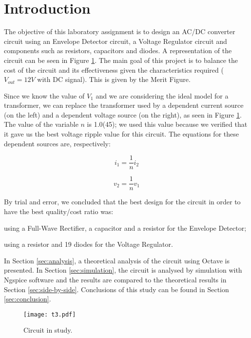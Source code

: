 \section{Introduction}
\label{sec:introduction}

The objective of this laboratory assignment is to design an AC/DC converter circuit using an Envelope Detector circuit, a Voltage Regulator circuit and components such as resistors, capacitors and diodes. A representation of the circuit can be seen in Figure \ref{fig:t3}. 
The main goal of this project is to balance the cost of the circuit and its effectiveness given the characteristics required ($V_{out}=12V$ with DC signal). This is given by the Merit Figure. \par
Since we know the value of $V_1$ and we are considering the ideal model for a transformer, we can replace the transformer used by a dependent current source (on the left) and a dependent voltage source (on the right), as seen in Figure \ref{fig:t3}. The value of the variable $n$ is 1.0(45); we used this value because we verified that it gave us the best voltage ripple value for this circuit. The equations for these dependent sources are, respectively:

\begin{equation}
  i_1=\frac{1}{n}i_2
  \label{eq:kvl1}
\end{equation} 

\begin{equation}
  v_2=\frac{1}{n}v_1
  \label{eq:kvl2}
\end{equation} 

By trial and error, we concluded that the best design for the circuit in order to have the best quality/cost ratio was:\par
\quad using a Full-Wave Rectifier, a capacitor and a resistor for the Envelope Detector;\par
\quad using a resistor and 19 diodes for the Voltage Regulator.

In Section \ref{sec:analysis}, a theoretical analysis of the circuit using Octave is
presented. In Section \ref{sec:simulation}, the circuit is analysed by
simulation with Ngspice software and the results are compared to the theoretical results in Section \ref{sec:side-by-side}. Conclusions of this study can be found in
Section \ref{sec:conclusion}.

\begin{figure}[htp] \centering
\texttt{[image: t3.pdf]}
\caption{Circuit in study.}
\label{fig:t3}
\end{figure}
\FloatBarrier

